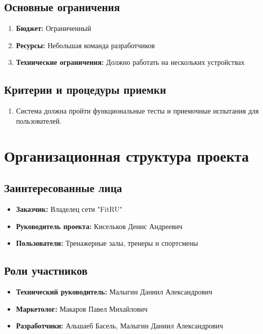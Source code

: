 \documentclass[14pt, russian]{matmex-diploma-custom}
\begin{document}
\subsection{Основные ограничения}
\begin{enumerate}
    \item \textbf{Бюджет:} Ограниченный
    \item \textbf{Ресурсы:} Небольшая команда разработчиков
    \item \textbf{Технические ограничения:} Должно работать на нескольких устройствах
\end{enumerate}

\subsection{Критерии и процедуры приемки}
\begin{enumerate}
    \item Система должна пройти функциональные тесты и приемочные испытания для пользователей.
\end{enumerate}


\section{Организационная структура проекта}
\subsection{Заинтересованные лица}
\begin{itemize}
\item \textbf{Заказчик:} Владелец сети "FitRU"
\item \textbf{Руководитель проекта:} Кисельков Денис Андреевич
\item \textbf{Пользователи:} Тренажерные залы, тренеры и спортсмены
\end{itemize}

\subsection{Роли участников}
\begin{itemize}
\item \textbf{Технический руководитель:} Малыгин Даниил Александрович
\item \textbf{Маркетолог:} Макаров Павел Михайлович
\item \textbf{Разработчики:} Альшаеб Басель, Малыгин Даниил Александрович
\end{itemize}
\end{document}
